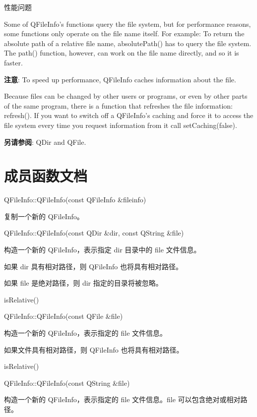 性能问题

Some of QFileInfo's functions query the file system, but for performance reasons, some functions only operate on the file name itself. For example: To return the absolute path of a relative file name, absolutePath() has to query the file system. The path() function, however, can work on the file name directly, and so it is faster.

\textbf{注意}: To speed up performance, QFileInfo caches information about the file.

Because files can be changed by other users or programs, or even by other parts of the same program, there is a function that refreshes the file information: refresh(). If you want to switch off a QFileInfo's caching and force it to access the file system every time you request information from it call setCaching(false).

\textbf{另请参阅}: QDir and QFile.

\splitLine 

\section{成员函数文档}

QFileInfo::QFileInfo(const QFileInfo \&fileinfo)

复制一个新的 QFileInfo。

QFileInfo::QFileInfo(const QDir \&dir, const QString \&file)

构造一个新的 QFileInfo，表示指定 dir 目录中的 file 文件信息。

如果 dir 具有相对路径，则 QFileInfo 也将具有相对路径。

如果 file 是绝对路径，则 dir 指定的目录将被忽略。

\begin{notice}[另请参阅]
 isRelative()
\end{notice}


QFileInfo::QFileInfo(const QFile \&file)

构造一个新的 QFileInfo，表示指定的 file 文件信息。

如果文件具有相对路径，则 QFileInfo 也将具有相对路径。

\begin{notice}[另请参阅]
 isRelative()
\end{notice}

QFileInfo::QFileInfo(const QString \&file)

构造一个新的 QFileInfo，表示指定的 file 文件信息。file 可以包含绝对或相对路径。


